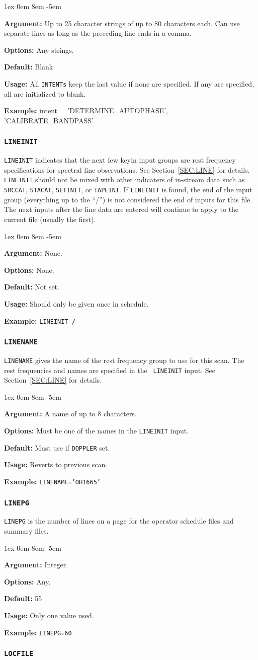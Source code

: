 \documentclass{report}
\newcommand{\rcwbox}[5]{
  \begin{list}{}{\parsep 1ex  \itemsep 0em
                 \leftmargin 8em  \itemindent -5em }
    \item {\bf Argument:} #1
    \item {\bf Options:}  #2
    \item {\bf Default:}  #3
    \item {\bf Usage:}    #4
    \item {\bf Example:}  #5
  \end{list}
}
\begin{document}
\rcwbox
{Up to 25 character strings of up to 80 characters each.  Can use 
separate lines as long as the preceding line ends in a comma.}
{Any strings.}
{Blank}
{All {\tt INTENTs} keep the last value if none are specified.  If any
are specified, all are initialized to blank.}
{intent = 'DETERMINE\_AUTOPHASE', 'CALIBRATE\_BANDPASS'}


\subsubsection{\label{MP:LINEINIT}{\tt LINEINIT}}

{\tt LINEINIT} indicates that the next few keyin input groups are rest
frequency specifications for spectral line observations. See
Section~\ref{SEC:LINE} for details. {\tt LINEINIT} should not be
mixed with other indicaters of in-stream data such as {\tt SRCCAT},
{\tt STACAT}, {\tt SETINIT}, or {\tt TAPEINI}.  If {\tt LINEINIT}
is found, the end of the input group (everything up to the ``/'')
is not considered the end of inputs for this file.  The next inputs
after the line data are entered will continue to apply to the current
file (usually the first).

\rcwbox
{None.}
{None.}
{Not set.}
{Should only be given once in schedule.}
{{\tt LINEINIT /}}


\subsubsection{\label{MP:LINENAME}{\tt LINENAME}}

{\tt LINENAME} gives the name of the rest frequency group to use for
this scan. The rest frequencies and names are specified in the {\tt
LINEINIT} input. See Section~\ref{SEC:LINE} for details.

\rcwbox
{A name of up to 8 characters.}
{Must be one of the names in the {\tt LINEINIT} input.}
{Must use if {\tt DOPPLER} set.}
{Reverts to previous scan.}
{{\tt LINENAME='OH1665'}}


\subsubsection{\label{MP:LINEPG}{\tt LINEPG}}

{\tt LINEPG} is the number of lines on a page for the operator
schedule files and summary files.

\rcwbox
{Integer.}
{Any.}
{55}
{Only one value used.}
{{\tt LINEPG=60}}

\subsubsection{\label{MP:LOCFILE}{\tt LOCFILE}}
\end{document}
